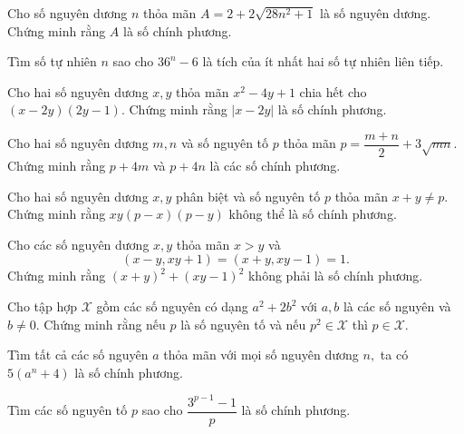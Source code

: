 \begin{btt}
Cho số nguyên dương $n$ thỏa mãn $A=2+2 \sqrt{28 n^{2}+1}$ là số nguyên dương. Chứng minh rằng $A$ là số chính phương.
\end{btt}

\begin{btt}
Tìm số tự nhiên $n$ sao cho $36^n-6$ là tích của ít nhất hai số tự nhiên liên tiếp.
\end{btt}

\begin{btt} \label{bdscp2}
Cho hai số nguyên dương $x, y$ thỏa mãn $x^{2}-4y+1$ chia hết cho $(x-2 y)(2 y-1)$. Chứng minh rằng $|x-2 y|$ là số chính phương.
\end{btt}

\begin{btt}
Cho hai số nguyên dương $m, n$ và số nguyên tố $p$ thỏa mãn
$p=\dfrac{m+n}{2}+3 \sqrt{m n}.$ Chứng minh rằng $p+4 m$ và $p+4 n$ là các số chính phương.
\end{btt}

\begin{btt}
Cho hai số nguyên dương $x,y$ phân biệt và số nguyên tố $p$ thỏa mãn $x+y\ne p.$ Chứng minh rằng $xy(p-x)(p-y)$ không thể là số chính phương.
\end{btt}

\begin{btt}
Cho các số nguyên dương $x,y$ thỏa mãn $x>y$ và $$(x-y, xy+1)=(x+y, xy-1)=1.$$
Chứng minh rằng $(x+y)^{2}+(x y-1)^{2}$ không phải là số chính phương.
\end{btt}

\begin{btt}
Cho tập hợp $\mathcal{X}$ gồm các số nguyên có dạng $a^2+2b^2$ với $a,b$ là các số nguyên và $b\ne 0.$ Chứng minh rằng nếu $p$ là số nguyên tố và nếu $p^2\in\mathcal{X}$ thì $p\in\mathcal{X}.$
\end{btt}

\begin{btt}
Tìm tất cả các số nguyên $a$ thỏa mãn với mọi số nguyên dương $n,$ ta có $5\left(a^n+4\right)$ là số chính phương.

\end{btt}


\begin{btt}
Tìm các số nguyên tố $p$ sao cho $\dfrac{3^{p-1}-1}{p}$ là số chính phương.
\end{btt}

